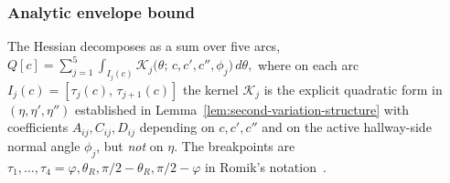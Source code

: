 \subsubsection*{Analytic envelope bound}

The Hessian decomposes as a sum over five arcs,
\(
   Q[c]
   = \sum_{j=1}^{5}\int_{I_{j}(c)}
       \mathcal{K}_{j}\!\bigl(\theta;\,c,c',c'',\phi_{j}\bigr)\,d\theta,
\)
where on each arc $I_{j}(c) = [\tau_{j}(c),\,\tau_{j+1}(c)]$ the
kernel $\mathcal{K}_{j}$ is the explicit quadratic form in
$(\eta,\eta',\eta'')$ established in
Lemma~\ref{lem:second-variation-structure} with coefficients
$A_{ij}, C_{ij}, D_{ij}$ depending on $c, c', c''$ and on the
active hallway-side normal angle $\phi_{j}$, but \emph{not} on
$\eta$. The breakpoints are
$\tau_{1},\ldots,\tau_{4} = \varphi,\theta_{R},\pi/2-\theta_{R},
\pi/2-\varphi$ in Romik's notation~\cite{Romik2018}.

